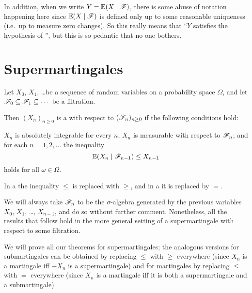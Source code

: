 \begin{abuse}
	In addition, when we write $Y = \mathbb E(X \mid \mathscr F)$,
	there is some abuse of notation happening here
	since $\mathbb E(X \mid \mathscr F)$ is defined only up to some reasonable uniqueness
	(i.e.\ up to measure zero changes).
	So this really means that
	``$Y$ satisfies the hypothesis of '',
	but this is so pedantic that no one bothers.
\end{abuse}


\section{Supermartingales}

\begin{definition}
	Let $X_0$, $X_1$, \dots be a sequence of random variables
	on a probability space $\Omega$,
	and let $\mathscr F_0 \subseteq \mathscr F_1 \subseteq \cdots$ be a filtration.

	Then $(X_n)_{n \ge 0}$ is a 
	with respect to $(\mathscr F_n)_{n \ge 0}$ if the following conditions hold:
	\begin{itemize}
		\ii $X_n$ is absolutely integrable for every $n$;
		\ii $X_n$ is measurable with respect to $\mathscr F_n$; and
		\ii for each $n = 1, 2, \dots$ the inequality
		\[ \mathbb E(X_n \mid \mathscr F_{n-1}) \le X_{n-1} \]
		holds for all $\omega \in \Omega$.
	\end{itemize}

	In a  the inequality $\le$ is replaced with $\ge$,
	and in a  it is replaced by $=$.
\end{definition}

\begin{abuse}
	We will always take $\mathscr F_n$ to be the $\sigma$-algebra
	generated by the previous variables $X_0$, $X_1$, \dots, $X_{n-1}$,
	and do so without further comment.
	Nonetheless, all the results that follow hold in the more general setting
	of a supermartingale with respect to some filtration.
\end{abuse}

We will prove all our theorems for supermartingales;
the analogous versions for submartingales can be obtained
by replacing $\le$ with $\ge$ everywhere
(since $X_n$ is a martingale iff $-X_n$ is a supermartingale)
and for martingales by replacing $\le$ with $=$ everywhere
(since $X_n$ is a martingale iff it is both a supermartingale
and a submartingale).

